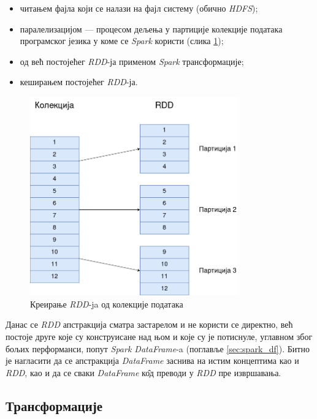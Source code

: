 \documentclass[12pt,oneside]{memoir}
\begin{document}
\begin{itemize}
\item читањем фајла који се налази на фајл систему (обично \textit{HDFS});
\item паралелизацијом --- процесом дељења у партиције колекције података програмског језика у коме се \textit{Spark} користи (слика \ref{fig:spark_rdd_creation_png});
\item од већ постојећег \textit{RDD}-ја применом \textit{Spark} трансформације;
\item кеширањем постојећег \textit{RDD}-ја.
\end{itemize}

\begin{figure}[!ht]
  \centering
  \includegraphics[width=0.80\textwidth]{pictures/spark_rdd_creation.png}
  \caption{Креирање \textit{RDD}-ja од колекције података}
  \label{fig:spark_rdd_creation_png}
\end{figure}

Данас се \textit{RDD} апстракција сматра застарелом и не користи се директно, већ постоје друге које су конструисане над њом и које су је потиснуле, углавном због бољих перформанси, попут \textit{Spark DataFrame}-a (поглавље \ref{sec:spark_df}). Битно је нагласити да се апстракција \textit{DataFrame} заснива на истим концептима као и \textit{RDD}, као и да се сваки \textit{DataFrame} к\^{о}д преводи у \textit{RDD} пре извршавања.

\subsection{Трансформације}
\label{subsec:spark_transf}
\end{document}
